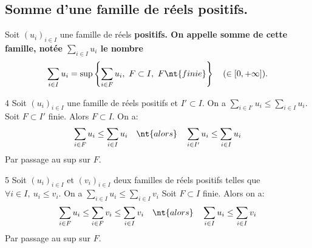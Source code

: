 \documentclass[11pt]{article}
\begin{document}
\subsection{Somme d'une famille de réels positifs.}

\begin{defi}{}{}
    Soit $(u_i)_{i\in I}$ une famille de réels \bf{positifs}. On appelle \bf{somme} de cette famille, notée $\sum_{i\in I}u_i$ le nombre
    \begin{equation*}
        \sum_{i\in I}u_i=\sup\left\{\sum_{i\in F}u_i, ~ F\subset I, ~ F \nt{ finie}\right\} \quad (\in[0,+\infty]).
    \end{equation*}
\end{defi}

\begin{prop}{}{4}
    Soit $(u_i)_{i\in I}$ une famille de réels positifs et $I'\subset I$. On a \large$\sum\limits_{i\in I'}u_i\leq \sum\limits_{i\in I}u_i$.
    \tcblower
    Soit $F\subset I'$ finie. Alors $F\subset I$. On a: 
    \begin{equation*}
        \sum_{i\in F}u_i\leq \sum_{i\in I}u_i\quad\nt{alors}\quad\sum_{i\in I'}u_i \leq \sum_{i\in I}u_i
    \end{equation*}
    Par passage au sup sur $F$.
\end{prop}

\begin{prop}{}{5}
    Soit $(u_i)_{i\in I}$ et $(v_i)_{i\in I}$ deux familles de réels positifs telles que $\forall i \in I,~u_i\leq v_i$. On a \large$\sum_{i\in I}u_i\leq\sum_{i\in I}v_i$
    \tcblower
    Soit $F\subset I$ finie. Alors on a:
    \begin{equation*}
        \sum_{i\in F}u_i\leq\sum_{i\in F}v_i\leq\sum_{i\in I}v_i\quad\nt{alors}\quad\sum_{i\in I}u_i\leq\sum_{i\in I}v_i
    \end{equation*}
    Par passage au sup sur $F$.
\end{prop}
\end{document}
